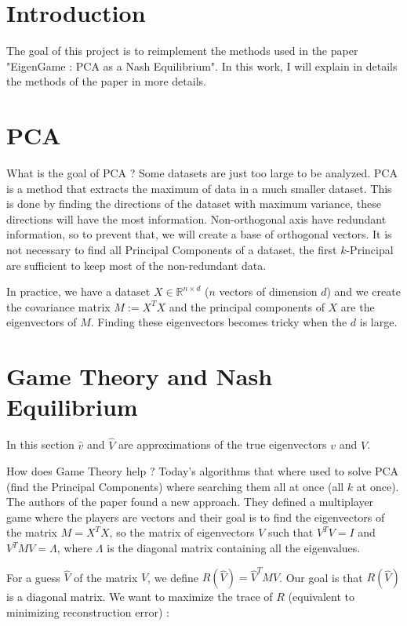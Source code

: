 \section{Introduction}

The goal of this project is to reimplement the methods used in the paper "EigenGame : PCA as a Nash Equilibrium". In this work, I will explain in details the methods of the paper in more details.


\section{PCA}

What is the goal of PCA ? Some datasets are just too large to be analyzed. PCA is a method that extracts the maximum of data in a much smaller dataset. This is done by finding the directions of the dataset with maximum variance, these directions will have the most information. Non-orthogonal axis have redundant information, so to prevent that, we will create a base of orthogonal vectors. It is not necessary to find all Principal Components of a dataset, the first $k$-Principal are sufficient to keep most of the non-redundant data.

In practice, we have a dataset $X \in \mathbb{R}^{n \times d}$ ($n$ vectors of dimension $d$) and we create the covariance matrix $M := X^T X$ and the principal components of $X$ are the eigenvectors of $M$. Finding these eigenvectors becomes tricky when the $d$ is large.

\section{Game Theory and Nash Equilibrium}

In this section $\hat{v}$ and $\hat{V}$ are approximations of the true eigenvectors $v$ and $V$.

How does Game Theory help ? Today's algorithms that where used to solve PCA (find the Principal Components) where searching them all at once (all $k$ at once). The authors of the paper found a new approach. They defined a multiplayer game where the players are vectors and their goal is to find the eigenvectors of the matrix $M = X^T X$, so the matrix of eigenvectors $V$ such that $V^T V = I$ and $V^T M V = \Lambda$, where $\Lambda$ is the diagonal matrix containing all the eigenvalues.

For a guess $\hat{V}$ of the matrix $V$, we define $R(\hat{V}) = \hat{V}^T M \hat{V}$. Our goal is that $R(\hat{V})$ is a diagonal matrix. We want to maximize the trace of $R$ (equivalent to minimizing reconstruction error) :

